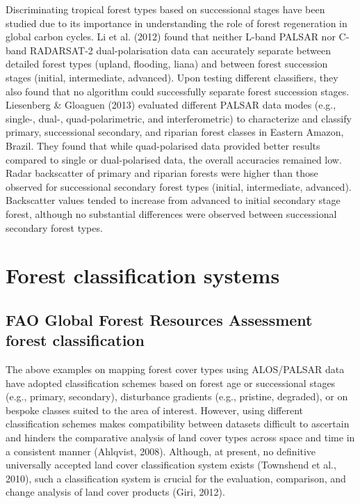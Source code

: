 Discriminating tropical forest types based on successional stages have been studied due to its importance in understanding the role of forest regeneration in global carbon cycles. Li et al. (2012) found that neither L-band PALSAR nor C-band RADARSAT-2 dual-polarisation data can accurately separate between detailed forest types (upland, flooding, liana) and between forest succession stages (initial, intermediate, advanced). Upon testing different classifiers, they also found that no algorithm could successfully separate forest succession stages. Liesenberg \& Gloaguen (2013) evaluated different PALSAR data modes (e.g., single-, dual-, quad-polarimetric, and interferometric) to characterize and classify primary, successional secondary, and riparian forest classes in Eastern Amazon, Brazil. They found that while quad-polarised data provided better results compared to single or dual-polarised data, the overall accuracies remained low. Radar backscatter of primary and riparian forests were higher than those observed for successional secondary forest types (initial, intermediate, advanced). Backscatter values tended to increase from advanced to initial secondary stage forest, although no substantial differences were observed between successional secondary forest types.

\section{Forest classification systems}
\label{sec: litrev-forest-class-system}

\subsection{FAO Global Forest Resources Assessment forest classification}

The above examples on mapping forest cover types using ALOS/PALSAR data have adopted classification schemes based on forest age or successional stages (e.g., primary, secondary), disturbance gradients (e.g., pristine, degraded), or on bespoke classes suited to the area of interest. However, using different classification schemes makes compatibility between datasets difficult to ascertain and hinders the comparative analysis of land cover types across space and time in a consistent manner (Ahlqvist, 2008). Although, at present, no definitive universally accepted land cover classification system exists (Townshend et al., 2010), such a classification system is crucial for the evaluation, comparison, and change analysis of land cover products (Giri, 2012).

